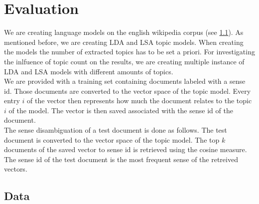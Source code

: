 \section{Evaluation}


We are creating language models on the english wikipedia corpus (see \ref{wikidump}). As mentioned before, we are creating LDA and LSA topic models. When creating the models the number of extracted topics has to be set a priori. For investigating the inlfuence of topic count on the results, we are creating multiple instance of LDA and LSA models with different amounts of topics.\\
We are provided with a training set containing documents labeled with a sense id. Those documents are converted to the vector space of the topic model. Every entry $i$ of the vector then represents how much the document relates to the topic $i$ of the model. The vector is then saved associated with the sense id of the document.\\
The sense disambiguation of a test document is done as follows. The test document is converted to the vector space of the topic model. The top $k$ documents of the saved vector to sense id is retrieved using the cosine measure. The sense id of the test document is the most frequent sense of the retreived vectors.




\subsection{Data}
\label{wikidump}



